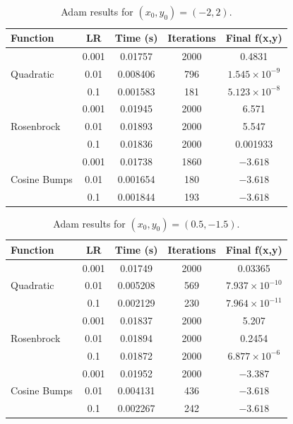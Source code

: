 \documentclass[conference]{IEEEtran}
\begin{document}
\begin{table}[H]
    \centering
    \caption{Adam results for $(x_0,y_0) = (-2,2)$.}
    \label{tab:adam_neg2_2}
    \begin{tabular}{lcccc}
        \hline
        \textbf{Function} & \textbf{LR} & \textbf{Time (s)} &
        \textbf{Iterations} & \textbf{Final f(x,y)} \\
        \hline

        \multirow{3}{*}{Quadratic}
        & 0.001 & 0.01757 & 2000 & 0.4831 \\
        & 0.01  & 0.008406 & 796 & $1.545\times10^{-9}$ \\
        & 0.1   & 0.001583 & 181 & $5.123\times10^{-8}$ \\
        \hline

        \multirow{3}{*}{Rosenbrock}
        & 0.001 & 0.01945 & 2000 & 6.571 \\
        & 0.01  & 0.01893 & 2000 & 5.547 \\
        & 0.1   & 0.01836 & 2000 & 0.001933 \\
        \hline

        \multirow{3}{*}{Cosine Bumps}
        & 0.001 & 0.01738 & 1860 & $-3.618$ \\
        & 0.01  & 0.001654 & 180 & $-3.618$ \\
        & 0.1   & 0.001844 & 193 & $-3.618$ \\
        \hline

    \end{tabular}
\end{table}

\begin{table}[H]
    \centering
    \caption{Adam results for $(x_0,y_0) = (0.5,-1.5)$.}
    \label{tab:adam_05_neg15}
    \begin{tabular}{lcccc}
        \hline
        \textbf{Function} & \textbf{LR} & \textbf{Time (s)} &
        \textbf{Iterations} & \textbf{Final f(x,y)} \\
        \hline

        \multirow{3}{*}{Quadratic}
        & 0.001 & 0.01749 & 2000 & 0.03365 \\
        & 0.01  & 0.005208 & 569 & $7.937\times10^{-10}$ \\
        & 0.1   & 0.002129 & 230 & $7.964\times10^{-11}$ \\
        \hline

        \multirow{3}{*}{Rosenbrock}
        & 0.001 & 0.01837 & 2000 & 5.207 \\
        & 0.01  & 0.01894 & 2000 & 0.2454 \\
        & 0.1   & 0.01872 & 2000 & $6.877\times10^{-6}$ \\
        \hline

        \multirow{3}{*}{Cosine Bumps}
        & 0.001 & 0.01952 & 2000 & $-3.387$ \\
        & 0.01  & 0.004131 & 436 & $-3.618$ \\
        & 0.1   & 0.002267 & 242 & $-3.618$ \\
        \hline

    \end{tabular}
\end{table}
\end{document}
